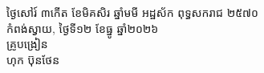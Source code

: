 \documentclass[a4paper,10pt]{article}
\begin{document}
\vspace{6pt}

\begin{flushright}
  \begin{minipage}{8.6cm}
    \centering
    ថ្ងៃសៅរ៍ ៣កើត ខែមិគសិរ ឆ្នាំមមី អដ្ឋស័ក ពុទ្ធសករាជ ២៥៧០\\
    កំពង់ស្វាយ, ថ្ងៃទី១២ ខែធ្នូ ឆ្នាំ២០២៦\\[4pt]
    {\muol គ្រូបង្រៀន}\\[32pt]
    \hfill{\muol ហុក ប៊ុនថែន}\hspace*{1.4cm}
  \end{minipage}
\end{flushright}
\end{document}
